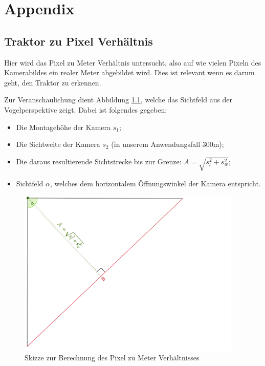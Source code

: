 \chapter{Appendix}

\section{Traktor zu Pixel Verhältnis} \label{apx:res}
Hier wird das Pixel zu Meter Verhältnis untersucht, also auf wie vielen Pixeln des Kamerabildes ein realer Meter abgebildet wird.
Dies ist relevant wenn es darum geht, den Traktor zu erkennen.

\bigskip
Zur Veranschaulichung dient Abbildung \ref{fig:apx:px_m}, welche das Sichtfeld aus der Vogelperspektive zeigt.
Dabei ist folgendes gegeben:
\begin{itemize}
    \item Die Montagehöhe der Kamera $s_1$;
    \item Die Sichtweite der Kamera $s_2$ (in unserem Anwendungsfall 300m);
    \item Die daraus resultierende Sichtstrecke bis zur Grenze: $A = \sqrt{s_l^2 + s_w^2}$;
    \item Sichtfeld $\alpha$, welches dem horizontalem Öffnungswinkel der Kamera entspricht.
\end{itemize}

\begin{figure}[!hbt]
    \center
    \includegraphics[width=0.95\textwidth]{figures/appendix/camera_bird}
    \caption{Skizze zur Berechnung des Pixel zu Meter Verhältnisses}
    \label{fig:apx:px_m}
\end{figure}

